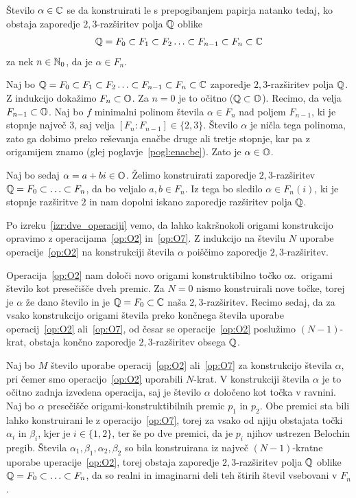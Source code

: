 \begin{izrek}
    \label{izr:orig_konstr}
    Število $\alpha \in \mathbb C$ se da konstruirati le s prepogibanjem papirja natanko tedaj, ko obstaja zaporedje $2,3$-razširitev polja $\mathbb Q$ oblike
    $$ \mathbb Q = F_0 \subset F_1 \subset F_2 \ldots \subset F_{n-1} \subset F_n \subset \mathbb C $$
    za nek $n \in \mathbb N_0$, da je $\alpha \in F_n$.
\end{izrek}

\begin{dokaz}
    Naj bo $ \mathbb Q = F_0 \subset F_1 \subset F_2 \ldots \subset F_{n-1} \subset F_n \subset \mathbb C $ zaporedje $2,3$-razširitev polja $\mathbb Q$. Z indukcijo dokažimo $F_n \subset \mathbb O$. Za $n = 0$ je to očitno ($\mathbb Q \subset \mathbb O$). Recimo, da velja $F_{n-1} \subset \mathbb O$. Naj bo $f$ minimalni polinom števila $\alpha \in F_n$ nad poljem $F_{n-1}$, ki je stopnje največ $3$, saj velja $[F_n : F_{n-1}] \in \{2,3\}$. Število $\alpha$ je ničla tega polinoma, zato ga dobimo preko reševanja enačbe druge ali tretje stopnje, kar pa z origamijem znamo (glej poglavje~\ref{pogl:enacbe}). Zato je $\alpha \in \mathbb O$.

    Naj bo sedaj $\alpha = a+bi \in \mathbb O$. Želimo konstruirati zaporedje $2,3$-razširitev $\mathbb Q = F_0 \subset \ldots \subset F_n$, da bo veljalo $a, b \in F_n$. Iz tega bo sledilo $\alpha \in F_n(i)$, ki je stopnje razširitve $2$ in nam dopolni iskano zaporedje razširitev polja $\mathbb Q$.

    Po izreku~\ref{izr:dve_operaciji} vemo, da lahko kakršnokoli origami konstrukcijo opravimo z operacijama~\ref{op:O2} in~\ref{op:O7}. Z indukcijo na številu $N$ uporabe operacije~\ref{op:O2} na konstrukciji števila $\alpha$ poiščimo zaporedje $2,3$-razširitev.

    Operacija~\ref{op:O2} nam določi novo origami konstruktibilno točko oz.\ origami število kot presečišče dveh premic. Za $N = 0$ nismo konstruirali nove točke, torej je $\alpha$ že dano število in je $\mathbb Q = F_0 \subset \mathbb C$ naša $2,3$-razširitev. Recimo sedaj, da za vsako konstrukcijo origami števila preko končnega števila uporabe operacij~\ref{op:O2} ali~\ref{op:O7}, od česar se operacije~\ref{op:O2} poslužimo $(N-1)$-krat, obstaja končno zaporedje $2,3$-razširitev obsega $\mathbb Q$.
    
    Naj bo $M$ število uporabe operacij~\ref{op:O2} ali~\ref{op:O7} za konstrukcijo števila $\alpha$, pri čemer smo operacijo~\ref{op:O2} uporabili $N$-krat. V konstrukciji števila $\alpha$ je to očitno zadnja izvedena operacija, saj je število $\alpha$ določeno kot točka v ravnini. Naj bo $\alpha$ presečišče origami-konstruktibilnih premic $p_1$ in $p_2$. Obe premici sta bili lahko konstruirani le z operacijo~\ref{op:O7}, torej za vsako od njiju obstajata točki $\alpha_i$ in $\beta_i$, kjer je $i \in \{1,2\}$, ter še po dve premici, da je $p_i$ njihov ustrezen Belochin pregib. Števila $\alpha_1, \beta_1, \alpha_2, \beta_2$ so bila konstruirana iz največ $(N-1)$-kratne uporabe uperacije~\ref{op:O2}, torej obstaja zaporedje $2,3$-razširitev polja $\mathbb Q$ oblike $\mathbb Q = F_0 \subset \ldots \subset F_n$, da so realni in imaginarni deli teh štirih števil vsebovani v $F_n$.
    

\end{dokaz}
